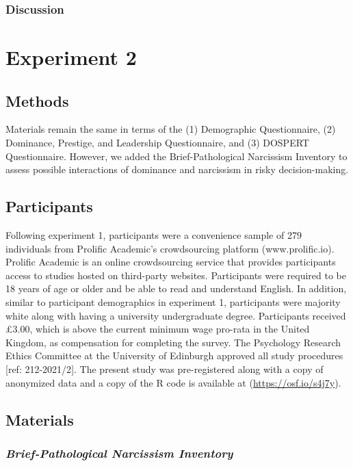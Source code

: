 \documentclass[
  donotrepeattitle,doc, 12pt, a4paper,floatsintext]{apa7}
\begin{document}
\hypertarget{discussion}{%
\subsubsection{Discussion}\label{discussion}}
\hypertarget{experiment-2}{%
\section{Experiment 2}\label{experiment-2}}
\hypertarget{methods-1}{%
\subsection{Methods}\label{methods-1}}
Materials remain the same in terms of the (1) Demographic Questionnaire, (2) Dominance, Prestige, and Leadership Questionnaire, and (3) DOSPERT Questionnaire. However, we added the Brief-Pathological Narcissism Inventory to assess possible interactions of dominance and narcissism in risky decision-making.
\hypertarget{participants}{%
\subsection{Participants}\label{participants}}
Following experiment 1, participants were a convenience sample of 279 individuals from Prolific Academic's crowdsourcing platform (www.prolific.io). Prolific Academic is an online crowdsourcing service that provides participants access to studies hosted on third-party websites. Participants were required to be 18 years of age or older and be able to read and understand English. In addition, similar to participant demographics in experiment 1, participants were majority white along with having a university undergraduate degree. Participants received £3.00, which is above the current minimum wage pro-rata in the United Kingdom, as compensation for completing the survey. The Psychology Research Ethics Committee at the University of Edinburgh approved all study procedures {[}ref: 212-2021/2{]}. The present study was pre-registered along with a copy of anonymized data and a copy of the R code is available at (\url{https://osf.io/s4j7y}).
\hypertarget{materials-1}{%
\subsection{Materials}\label{materials-1}}
\hypertarget{brief-pathological-narcissism-inventory}{%
\subsubsection{\texorpdfstring{\emph{Brief-Pathological Narcissism Inventory}}{Brief-Pathological Narcissism Inventory}}\label{brief-pathological-narcissism-inventory}}
\end{document}
